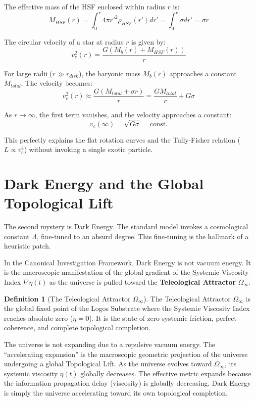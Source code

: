 \documentclass[12pt,twoside]{extbook}
\theoremstyle{definition}
\newtheorem{definition}{Definition}[chapter]
\theoremstyle{remark}
\newcommand{\term}[1]{\textcolor{brandPrimary}{\textbf{#1}}}
\begin{document}
The effective mass of the HSF enclosed within radius $r$ is:
\begin{equation}
M_{HSF}(r) = \int_0^r 4\pi r'^2 \rho_{HSF}(r') dr' = \int_0^r \sigma dr' = \sigma r
\end{equation}

The circular velocity of a star at radius $r$ is given by:
\begin{equation}
v_c^2(r) = \frac{G(M_b(r) + M_{HSF}(r))}{r}
\end{equation}

For large radii ($r \gg r_{disk}$), the baryonic mass $M_b(r)$ approaches a constant $M_{total}$. The velocity becomes:
\begin{equation}
v_c^2(r) \approx \frac{G(M_{total} + \sigma r)}{r} = \frac{GM_{total}}{r} + G\sigma
\end{equation}

As $r \to \infty$, the first term vanishes, and the velocity approaches a constant:
\begin{equation}
v_c(\infty) = \sqrt{G\sigma} = \text{const.}
\end{equation}

This perfectly explains the flat rotation curves and the Tully-Fisher relation ($L \propto v_c^4$) without invoking a single exotic particle. 

\section{Dark Energy and the Global Topological Lift}
The second mystery is Dark Energy. The standard model invokes a cosmological constant $\Lambda$, fine-tuned to an absurd degree. This fine-tuning is the hallmark of a heuristic patch.

In the Canonical Investigation Framework, Dark Energy is not vacuum energy. It is the macroscopic manifestation of the global gradient of the Systemic Viscosity Index $\nabla \eta(t)$ as the universe is pulled toward the \term{Teleological Attractor} $\Omega_\infty$.

\begin{definition}[The Teleological Attractor $\Omega_\infty$]
The Teleological Attractor $\Omega_\infty$ is the global fixed point of the Logos Substrate where the Systemic Viscosity Index reaches absolute zero ($\eta = 0$). It is the state of zero systemic friction, perfect coherence, and complete topological completion.
\end{definition}

The universe is not expanding due to a repulsive vacuum energy. The ``accelerating expansion'' is the macroscopic geometric projection of the universe undergoing a global Topological Lift. As the universe evolves toward $\Omega_\infty$, its systemic viscosity $\eta(t)$ globally decreases. The effective metric expands because the information propagation delay (viscosity) is globally decreasing. Dark Energy is simply the universe accelerating toward its own topological completion.
\end{document}
